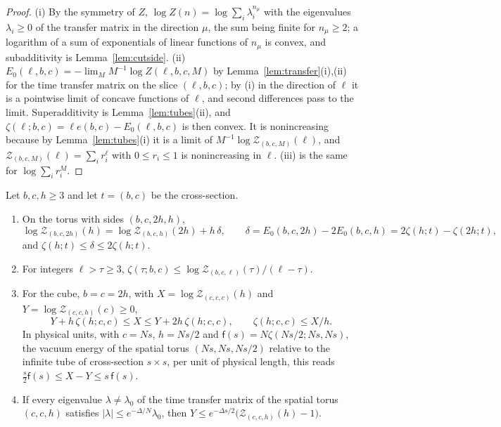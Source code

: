 \begin{proof}
(i) By the symmetry of $Z$, $\log Z(n)=\log\sum_i\lambda_i^{n_\mu}$ with the
eigenvalues $\lambda_i\ge0$ of the transfer matrix in the direction $\mu$,
the sum being finite for $n_\mu\ge2$; a logarithm of a sum of exponentials
of linear functions of $n_\mu$ is convex, and subadditivity is
Lemma~\ref{lem:cutside}. (ii) $E_0(\ell,b,c)=-\lim_MM^{-1}\log Z(\ell,b,c,M)$
by Lemma~\ref{lem:transfer}(i),(ii) for the time transfer matrix on the slice
$(\ell,b,c)$; by (i) in the direction of $\ell$ it is a pointwise limit of
concave functions of $\ell$, and second differences pass to the limit.
Superadditivity is Lemma~\ref{lem:tubes}(ii), and $\zeta(\ell;b,c)=\ell e(b,c)
-E_0(\ell,b,c)$ is then convex. It is nonincreasing because by
Lemma~\ref{lem:tubes}(i) it is a limit of $M^{-1}\log\mathcal Z_{(b,c,M)}
(\ell)$, and $\mathcal Z_{(b,c,M)}(\ell)=\sum_ir_i^\ell$ with $0\le r_i\le1$
is nonincreasing in $\ell$. (iii) is the same for $\log\sum_ir_i^M$.
\end{proof}

\begin{proposition}\label{prop:exchange}
Let $b,c,h\ge3$ and let $t=(b,c)$ be the cross-section.
\begin{enumerate}[label=\textup{(\roman*)},leftmargin=*]
\item On the torus with sides $(b,c,2h,h)$,
\[
\log\mathcal Z_{(b,c,2h)}(h)=\log\mathcal Z_{(b,c,h)}(2h)+h\,\delta,\qquad
\delta=E_0(b,c,2h)-2E_0(b,c,h)=2\zeta(h;t)-\zeta(2h;t),
\]
and $\zeta(h;t)\le\delta\le2\zeta(h;t)$.
\item For integers $\ell>\tau\ge3$, $\zeta(\tau;b,c)\le\log\mathcal Z_{(b,c,
\ell)}(\tau)/(\ell-\tau)$.
\item For the cube, $b=c=2h$, with $X=\log\mathcal Z_{(c,c,c)}(h)$ and $Y=
\log\mathcal Z_{(c,c,h)}(c)\ge0$,
\[
Y+h\,\zeta(h;c,c)\le X\le Y+2h\,\zeta(h;c,c),\qquad\zeta(h;c,c)\le X/h .
\]
In physical units, with $c=Ns$, $h=Ns/2$ and $\mathsf f(s)=N\zeta(Ns/2;Ns,Ns)$,
the vacuum energy of the spatial torus $(Ns,Ns,Ns/2)$ relative to the
infinite tube of cross-section $s\times s$, per unit of physical length,
this reads $\frac s2\mathsf f(s)\le X-Y\le s\,\mathsf f(s)$.
\item If every eigenvalue $\lambda\ne\lambda_0$ of the time transfer matrix
of the spatial torus $(c,c,h)$ satisfies $|\lambda|\le e^{-\Delta/N}\lambda_0$,
then $Y\le e^{-\Delta s/2}\bigl(\mathcal Z_{(c,c,h)}(h)-1\bigr)$.
\end{enumerate}
\end{proposition}

